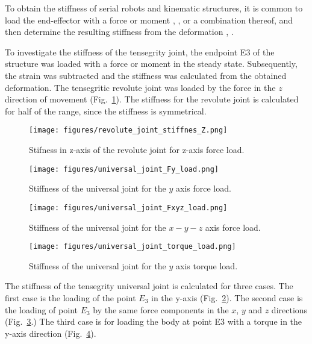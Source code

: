 \documentclass{article}
\begin{document}
To obtain the stiffness of serial robots and kinematic structures, it is common to load the end-effector with a force or moment \cite{Ref_Jubien_STIFFNESS_Identicication_KUKA}, \cite{Ref_Dumas_STIFFNESS_identicication_serial_robots}, or a combination thereof, and then determine the resulting stiffness from the deformation \cite{Ref_Palli_STIFFNESS_Joint_var_stiffness}, \cite{Ref_Dumas_STIFFNESS_stiffness_identification_6dof}. 

To investigate the stiffness of the tensegrity joint, the endpoint E3 of the structure was loaded with a force or moment in the steady state. Subsequently, the strain was subtracted and the stiffness was calculated from the obtained deformation. The tensegritic revolute joint was loaded by the force in the $z$ direction of movement (Fig.~\ref{fig:revolute_joint_stiffness_z_axis}). The stiffness for the revolute joint is calculated for half of the range, since the stiffness is symmetrical.

\begin{figure}
    \centering
    \texttt{[image: figures/revolute\_joint\_stiffnes\_Z.png]}
    \caption{Stifness in z-axis of the revolute joint for z-axis force load. }
    \label{fig:revolute_joint_stiffness_z_axis}
\end{figure}

\begin{figure}
    \centering
    \texttt{[image: figures/universal\_joint\_Fy\_load.png]}
    \caption{Stiffness of the universal joint for the $y$ axis force load.}
    \label{fig:universal_joint_Fy}
\end{figure}

\begin{figure}
    \centering
    \texttt{[image: figures/universal\_joint\_Fxyz\_load.png]}
    \caption{Stiffness of the universal joint for the $x-y-z$ axis force load.}
    \label{fig:universal_joint_Fxyz}
\end{figure}

\begin{figure}
    \centering
    \texttt{[image: figures/universal\_joint\_torque\_load.png]}
    \caption{Stiffness of the universal joint for the $y$ axis torque load.}
    \label{fig:universal_joint_My}
\end{figure}

The stiffness of the tensegrity universal joint is calculated for three cases. The first case is the loading of the point $E_3$ in the y-axis (Fig.~\ref{fig:universal_joint_Fy}). The second case is the loading of point $E_3$ by the same force components in the $x$, $y$ and $z$ directions (Fig.~\ref{fig:universal_joint_Fxyz}.) The third case is for loading the body at point E3 with a torque in the y-axis direction (Fig.~\ref{fig:universal_joint_My}).
\end{document}
